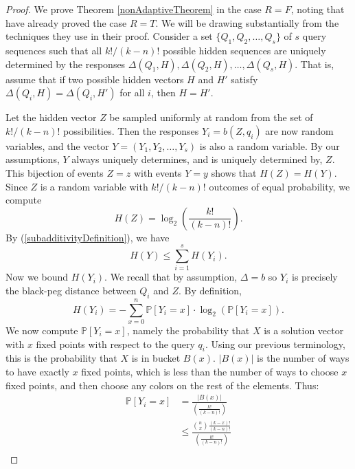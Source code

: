 \documentclass[12pt, a4paper]{article}
\begin{document}
\begin{proof}
	We prove Theorem \ref{nonAdaptiveTheorem} in the case $R = F$, noting that \cite{DS13} have already proved the case $R=T$. We will be drawing substantially from the techniques they use in their proof. Consider a set $\{Q_1, Q_2, \ldots, Q_s\}$ of $s$ query sequences such that all $k!/(k-n)!$ possible hidden sequences are uniquely determined by the responses $\Delta(Q_1, H), \Delta(Q_2, H), \ldots, \Delta(Q_s, H)$. That is, assume that if two possible hidden vectors $H$ and $H'$ satisfy $\Delta(Q_i, H) = \Delta(Q_i, H')$ for all $i$, then $H = H'$.

	Let the hidden vector $Z$ be sampled uniformly at random from the set of $k!/(k-n)!$ possibilities. Then the responses $Y_i = b(Z, q_i)$ are now random variables, and the vector $Y = (Y_1, Y_2, \ldots, Y_s)$ is also a random variable. By our assumptions, $Y$ always uniquely determines, and is uniquely determined by, $Z$. This bijection of events  $Z=z$ with events $Y=y$ shows that $H(Z) = H(Y)$. Since $Z$ is a random variable with $k!/(k-n)!$ outcomes of equal probability, we compute
	\begin{equation}\label{equalEntropy}
		H(Z) = \log_2\left(\frac{k!}{(k-n)!}\right).
	\end{equation}
	By (\ref{subadditivityDefinition}), we have
	\begin{equation}\label{entropySum}
		H(Y)\le\sum_{i=1}^s H(Y_i).
	\end{equation}
	Now we bound $H(Y_i)$. We recall that by assumption, $\Delta = b$ so $Y_i$ is precisely the black-peg distance between $Q_i$ and $Z$. By definition,
	\begin{equation}\label{entropyDef}
		H(Y_i)=-\sum_{x=0}^n \mathbb{P}[Y_i=x]\cdot\log_2(\mathbb{P}[Y_{i}=x]).
	\end{equation}
	We now compute $\mathbb{P}[Y_i=x]$, namely the probability that $X$ is a solution vector with $x$ fixed points with respect to the query $q_i$. Using our previous terminology, this is the probability that $X$ is in bucket $B(x)$.
	$|B(x)|$ is the number of ways to have exactly $x$ fixed points, which is less than the number of ways to choose $x$ fixed points, and then choose any colors on the rest of the elements. Thus:
	\begin{align*}
		\mathbb{P}[Y_i = x] &= \frac{|B(x)|}{\left(\frac{k!}{(k-n)!}\right)}\\
		&\leq \frac{\binom{n}{x}\frac{(k-x)!}{(k-n)!}}{\left(\frac{k!}{(k-n)!}\right)}\\

\end{align*}
\end{proof}
\end{document}
